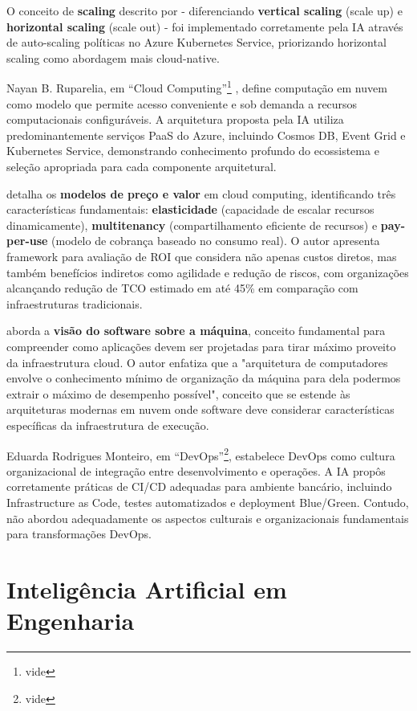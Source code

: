 O conceito de \textbf{scaling} descrito por  - diferenciando \textbf{vertical scaling} (scale up) e \textbf{horizontal scaling} (scale out) - foi implementado corretamente pela IA através de auto-scaling políticas no Azure Kubernetes Service, priorizando horizontal scaling como abordagem mais cloud-native.

Nayan B. Ruparelia, em ``Cloud Computing''\footnote{vide } , define computação em nuvem como modelo que permite acesso conveniente e sob demanda a recursos computacionais configuráveis. A arquitetura proposta pela IA utiliza predominantemente serviços PaaS do Azure, incluindo Cosmos DB, Event Grid e Kubernetes Service, demonstrando conhecimento profundo do ecossistema e seleção apropriada para cada componente arquitetural.

 detalha os \textbf{modelos de preço e valor} em cloud computing, identificando três características fundamentais: \textbf{elasticidade} (capacidade de escalar recursos dinamicamente), \textbf{multitenancy} (compartilhamento eficiente de recursos) e \textbf{pay-per-use} (modelo de cobrança baseado no consumo real). O autor apresenta framework para avaliação de ROI que considera não apenas custos diretos, mas também benefícios indiretos como agilidade e redução de riscos, com organizações alcançando redução de TCO estimado em até 45\% em comparação com infraestruturas tradicionais.

 aborda a \textbf{visão do software sobre a máquina}, conceito fundamental para compreender como aplicações devem ser projetadas para tirar máximo proveito da infraestrutura cloud. O autor enfatiza que a "arquitetura de computadores envolve o conhecimento mínimo de organização da máquina para dela podermos extrair o máximo de desempenho possível", conceito que se estende às arquiteturas modernas em nuvem onde software deve considerar características específicas da infraestrutura de execução.

Eduarda Rodrigues Monteiro, em ``DevOps''\footnote{vide }, estabelece DevOps como cultura organizacional de integração entre desenvolvimento e operações. A IA propôs corretamente práticas de CI/CD adequadas para ambiente bancário, incluindo Infrastructure as Code, testes automatizados e deployment Blue/Green. Contudo, não abordou adequadamente os aspectos culturais e organizacionais fundamentais para transformações DevOps.

\section{Inteligência Artificial em Engenharia}

